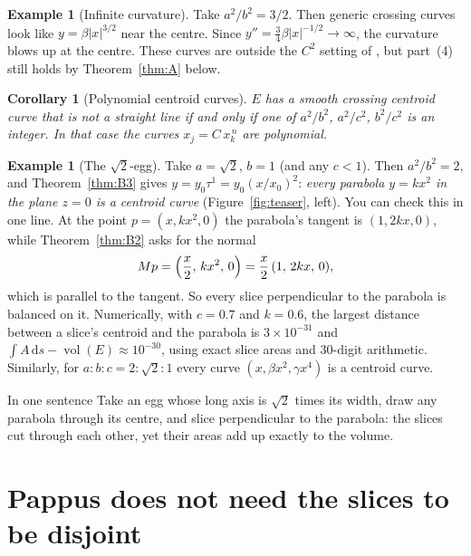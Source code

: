 \documentclass[11pt]{article}
\theoremstyle{plain}
\newtheorem{corollary}[lemma]{Corollary}
\theoremstyle{definition}
\newtheorem{example}[lemma]{Example}
\theoremstyle{remark}
\newcommand{\vol}{\operatorname{vol}}
\newcommand{\dd}{\,\mathrm{d}}
\begin{document}
\begin{example}[Infinite curvature]
Take $a^2/b^2=3/2$. Then generic crossing curves look like $y=\beta|x|^{3/2}$ near the centre. Since $y''=\tfrac34\beta|x|^{-1/2}\to\infty$, the curvature blows up at the centre. These curves are outside the $C^2$ setting of \cite{schmid}, but part~(4) still holds by Theorem~\ref{thm:A} below.
\end{example}

\begin{corollary}[Polynomial centroid curves]\label{cor:B5}
$E$ has a smooth crossing centroid curve that is not a straight line if and only if one of $a^2/b^2$, $a^2/c^2$, $b^2/c^2$ is an integer. In that case the curves $x_j=C\,x_k^{\,n}$ are polynomial.
\end{corollary}

\begin{example}[The $\sqrt2$-egg]\label{ex:egg}
Take $a=\sqrt2$, $b=1$ (and any $c<1$). Then $a^2/b^2=2$, and Theorem~\ref{thm:B3} gives $y=y_0\tau^{1}=y_0(x/x_0)^2$: \emph{every parabola $y=kx^2$ in the plane $z=0$ is a centroid curve} (Figure~\ref{fig:teaser}, left). You can check this in one line. At the point $p=(x,kx^2,0)$ the parabola's tangent is $(1,2kx,0)$, while Theorem~\ref{thm:B2} asks for the normal
\[
  Mp=\Bigl(\frac{x}{2},\,kx^2,\,0\Bigr)=\frac x2\,(1,\,2kx,\,0),
\]
which is parallel to the tangent. So every slice perpendicular to the parabola is balanced on it. Numerically, with $c=0.7$ and $k=0.6$, the largest distance between a slice's centroid and the parabola is $3\times10^{-31}$ and $\int A\dd s-\vol(E)\approx10^{-30}$, using exact slice areas and 30-digit arithmetic. Similarly, for $a:b:c=2:\sqrt2:1$ every curve $(x,\beta x^2,\gamma x^4)$ is a centroid curve.
\end{example}

\begin{sidebox}{In one sentence}
Take an egg whose long axis is $\sqrt2$ times its width, draw any parabola through its centre, and slice perpendicular to the parabola: the slices cut through each other, yet their areas add up exactly to the volume.
\end{sidebox}

\section{Pappus does not need the slices to be disjoint}\label{sec:overlap}
\end{document}

